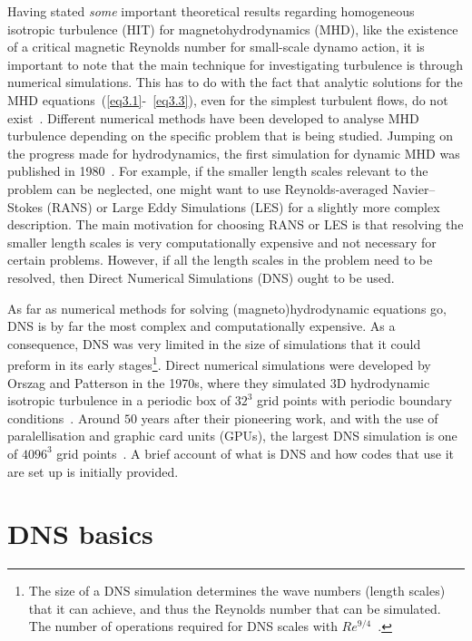 \documentclass[12pt,a4paper]{report}
\begin{document}
Having stated \textit{some} important theoretical results regarding homogeneous isotropic turbulence (HIT) for magnetohydrodynamics (MHD), like the existence of a critical magnetic Reynolds number for small-scale dynamo action, it is important to note that the main technique for investigating turbulence is through numerical simulations. This has to do with the fact that analytic solutions for the MHD equations~(\ref{eq3.1}-~\ref{eq3.3}), even for the simplest turbulent flows, do not exist~\cite{moin1998direct}. Different numerical methods have been developed to analyse MHD turbulence depending on the specific problem that is being studied. Jumping on the progress made for hydrodynamics, the first simulation for  dynamic MHD was published in 1980~\cite{norman2010historical}. For example, if the smaller length scales relevant to the problem can be neglected, one might want to use Reynolds-averaged Navier–Stokes (RANS) or Large Eddy Simulations (LES) for a slightly more complex description. The main motivation for choosing RANS or LES is that resolving the smaller length scales is very computationally expensive and not necessary for certain problems. However, if all the length scales in the problem need to be resolved, then Direct Numerical Simulations (DNS) ought to be used. 

As far as numerical methods for solving (magneto)hydrodynamic equations go, DNS is by far the most complex and computationally expensive. As a consequence, DNS was very limited in the size of simulations that it could preform in its early stages\footnote{The size of a DNS simulation determines the wave numbers (length scales) that it can achieve, and thus the Reynolds number that can be simulated. The number of operations required for DNS scales with $Re^{9/4}$~\cite{mccomb1990physics}.}. Direct numerical simulations were developed by Orszag and Patterson in the 1970s, where they simulated 3D hydrodynamic isotropic turbulence in a periodic box of $32^3$ grid points with periodic boundary conditions~\cite{orszag1970analytical}. Around $50$ years after their pioneering work, and with the use of paralellisation and graphic card units (GPUs), the largest DNS simulation is one of $4096^3$ grid points~\cite{yokota2013petascale}. A brief account of what is DNS and how codes that use it are set up is initially provided. 

\section{DNS basics}
\end{document}
